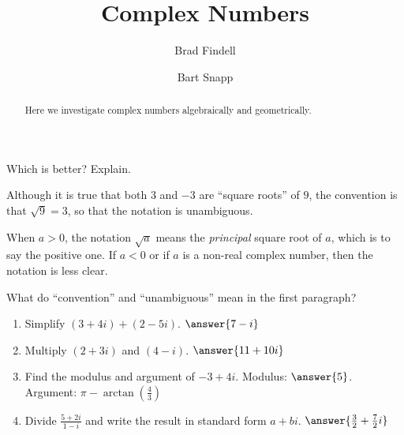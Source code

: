 \documentclass{ximera}
\title{Complex Numbers}
\author{Brad Findell \and Bart Snapp}
\begin{document}
\begin{abstract}
Here we investigate complex numbers algebraically and geometrically.
\end{abstract}
\maketitle

\begin{question}
Which is better?  Explain. 
\begin{multipleChoice}
\end{multipleChoice}
\begin{question}
Although it is true that both $3$ and $-3$ are ``square roots'' of $9$, the convention is that $\sqrt{9}=3$, so that the notation is unambiguous.  

When $a>0$, the notation $\sqrt{a}$ means the \emph{principal} square root of $a$, which is to say the positive one.  If $a<0$ or if $a$ is a non-real complex number, then the notation is less clear.

What do ``convention'' and ``unambiguous'' mean in the first paragraph? 
\end{question}

\end{question}


\begin{question}
\begin{enumerate}
\item Simplify $(3 + 4i) + (2 - 5i)$. $\answer{7-i}$
\item Multiply $(2 + 3i)$ and $(4 - i)$.  $\answer{11+10i}$
\item Find the modulus and argument of $-3 + 4i$.  Modulus: $\answer{5}$.  Argument: $\pi-\arctan(\frac{4}{3})$
\item Divide $\frac{5 + 2i}{1 - i}$ and write the result in standard form $a + bi$.   $\answer{\frac{3}{2}+\frac{7}{2}i}$
\end{enumerate}


\end{question}

\end{document}
